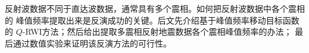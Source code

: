 反射波数据不同于直达波数据，通常具有多个震相。如何把反射波数据中各个震相的
峰值频率提取出来是反演成功的关键。后文先介绍基于峰值频率移动目标函数的
$Q$-RWI方法；然后给出提取多震相反射地震数据各个震相峰值频率的办法；
最后通过数值实验来证明该反演方法的可行性。

\begin{figure}[!htbp]
    \centering

\end{figure}
